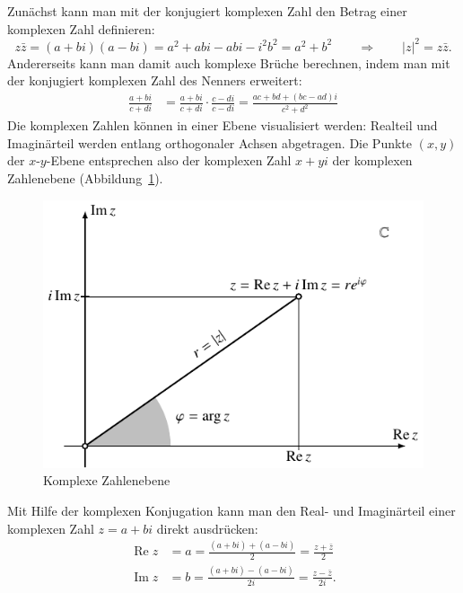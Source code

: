 Zunächst kann man mit der konjugiert komplexen Zahl den Betrag einer
komplexen Zahl definieren:
\[
z\bar z=(a+bi)(a-bi)=a^2+abi-abi-i^2b^2=a^2+b^2\qquad\Rightarrow\qquad
|z|^2=z\bar z.
\]
Andererseits kann man damit auch komplexe Brüche berechnen, indem man
mit der konjugiert komplexen Zahl des Nenners erweitert:
\begin{align*}
\frac{a+bi}{c+di}&=
\frac{a+bi}{c+di}
\cdot
\frac{c-di}{c-di}=\frac{ac+bd+(bc-ad)i}{c^2+d^2}
\end{align*}
Die komplexen Zahlen können in einer Ebene visualisiert werden: 
Realteil und Imaginärteil werden entlang orthogonaler Achsen abgetragen.
Die Punkte $(x,y)$ der $x$-$y$-Ebene entsprechen also der komplexen Zahl
$x+yi$ der komplexen Zahlenebene (Abbildung~\ref{skript:gaussebene}).
\begin{figure}
\centering
\includegraphics{chapters/a-komplex/gauss.pdf}
\caption{Komplexe Zahlenebene
\label{skript:gaussebene}}
\end{figure}
%
%

Mit Hilfe der komplexen Konjugation kann man den Real- und Imaginärteil
einer komplexen Zahl $z=a+bi$ direkt ausdrücken:
\begin{align}
\operatorname{Re}z 
&=
a=\frac{(a+bi)+(a-bi)}2=\frac{z+\bar z}2
\label{skript:realteil-formel}
\\
\operatorname{Im}z
&=
b=\frac{(a+bi)-(a-bi)}{2i}=\frac{z-\bar z}{2i}.
\label{skript:imaginaerteil-formel}
\end{align}

